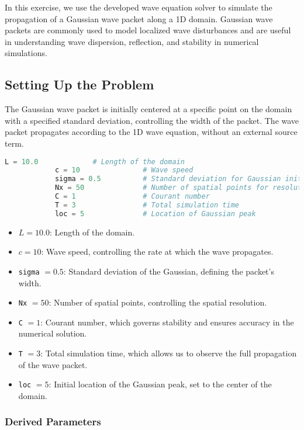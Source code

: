 \documentclass{article}
\begin{document}
		 In this exercise, we use the developed wave equation solver to simulate the propagation of a Gaussian wave packet along a 1D domain. Gaussian wave packets are commonly used to model localized wave disturbances and are useful in understanding wave dispersion, reflection, and stability in numerical simulations. 
		 
		 \subsection{Setting Up the Problem}
		 
		 The Gaussian wave packet is initially centered at a specific point on the domain with a specified standard deviation, controlling the width of the packet. The wave packet propagates according to the 1D wave equation, without an external source term.
		 
		 \begin{lstlisting}[language=Python]
		 	L = 10.0             # Length of the domain
		 	c = 10               # Wave speed
		 	sigma = 0.5          # Standard deviation for Gaussian initial condition
		 	Nx = 50              # Number of spatial points for resolution
		 	C = 1                # Courant number
		 	T = 3                # Total simulation time
		 	loc = 5              # Location of Gaussian peak
		 \end{lstlisting}
		 
		 \begin{itemize}
		 	\item \( L = 10.0 \): Length of the domain.
		 	\item \( c = 10 \): Wave speed, controlling the rate at which the wave propagates.
		 	\item \texttt{sigma} \( = 0.5 \): Standard deviation of the Gaussian, defining the packet's width.
		 	\item \texttt{Nx} \( = 50 \): Number of spatial points, controlling the spatial resolution.
		 	\item \texttt{C} \( = 1 \): Courant number, which governs stability and ensures accuracy in the numerical solution.
		 	\item \texttt{T} \( = 3 \): Total simulation time, which allows us to observe the full propagation of the wave packet.
		 	\item \texttt{loc} \( = 5 \): Initial location of the Gaussian peak, set to the center of the domain.
		 \end{itemize}
		 
		 \subsubsection{Derived Parameters}
		 
\end{document}
